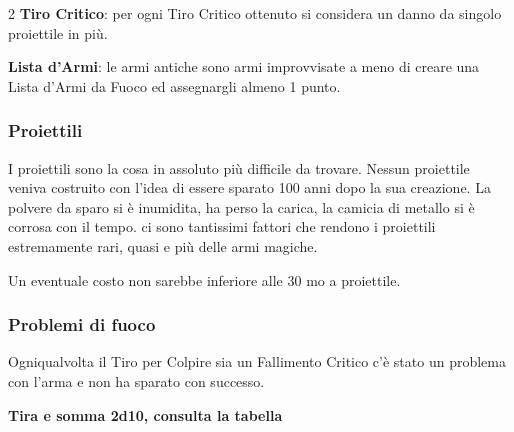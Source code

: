 \begin{multicols}{2}
\textbf{Tiro Critico}: per ogni Tiro Critico ottenuto si considera un danno da singolo proiettile in più.

\textbf{Lista d'Armi}: le armi antiche sono armi improvvisate a meno di creare una Lista d'Armi da Fuoco ed assegnargli almeno 1 punto.

\subsubsection*{Proiettili}

I proiettili sono la cosa in assoluto più difficile da trovare. Nessun proiettile veniva costruito con l'idea di essere sparato 100 anni dopo la sua creazione.
La polvere da sparo si è inumidita, ha perso la carica, la camicia di metallo si è corrosa con il tempo. ci sono tantissimi fattori che rendono i proiettili estremamente rari, quasi e più delle armi magiche.

Un eventuale costo non sarebbe inferiore alle 30 mo a proiettile.

\subsubsection*{Problemi di fuoco}

Ogniqualvolta il Tiro per Colpire sia un Fallimento Critico c'è stato un problema con l'arma e non ha sparato con successo.

\medskip

\textbf{Tira e somma 2d10, consulta la tabella}

\medskip


\end{multicols}
